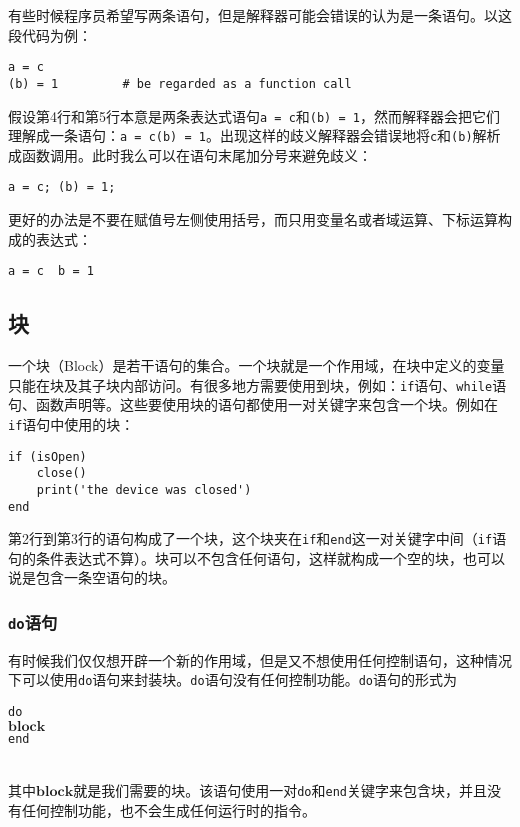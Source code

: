 有些时候程序员希望写两条语句，但是解释器可能会错误的认为是一条语句。以这段代码为例：
\begin{lstlisting}[language=berry, numbers=none]
a = c
(b) = 1         # be regarded as a function call
\end{lstlisting}
假设第4行和第5行本意是两条表达式语句\texttt{a = c}和\texttt{(b) = 1}，然而解释器会把它们理解成一条语句：\texttt{a = c(b) = 1}。出现这样的歧义解释器会错误地将\texttt{c}和\texttt{(b)}解析成函数调用。此时我么可以在语句末尾加分号来避免歧义：
\begin{lstlisting}[language=berry, numbers=none]
a = c; (b) = 1;
\end{lstlisting}
更好的办法是不要在赋值号左侧使用括号，而只用变量名或者域运算、下标运算构成的表达式：
\begin{lstlisting}[language=berry, numbers=none]
a = c  b = 1
\end{lstlisting}

\subsection{块} \label{section:block}

一个块（Block）是若干语句的集合。一个块就是一个作用域，在块中定义的变量只能在块及其子块内部访问。有很多地方需要使用到块，例如：\texttt{if}语句、\texttt{while}语句、函数声明等。这些要使用块的语句都使用一对关键字来包含一个块。例如在\texttt{if}语句中使用的块：
\begin{lstlisting}[language=berry]
if (isOpen)
    close()
    print('the device was closed')
end
\end{lstlisting}
第2行到第3行的语句构成了一个块，这个块夹在\texttt{if}和\texttt{end}这一对关键字中间（\texttt{if}语句的条件表达式不算）。块可以不包含任何语句，这样就构成一个空的块，也可以说是包含一条空语句的块。

\subsubsection{\texttt{do}语句}

有时候我们仅仅想开辟一个新的作用域，但是又不想使用任何控制语句，这种情况下可以使用\texttt{do}语句来封装块。\texttt{do}语句没有任何控制功能。\texttt{do}语句的形式为
\begin{algorithm}
    \texttt{do}\\
    \qquad $\bm{block}$ \\
    \texttt{end}
\end{algorithm}\vspace{-0.6em}\\
其中$\bm{block}$就是我们需要的块。该语句使用一对\texttt{do}和\texttt{end}关键字来包含块，并且没有任何控制功能，也不会生成任何运行时的指令。

